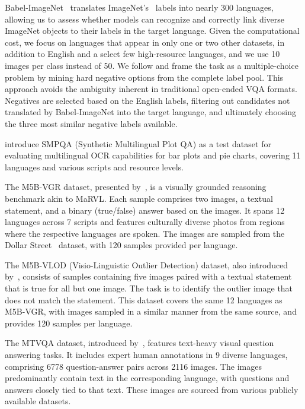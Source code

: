 %
%
Babel-ImageNet~\cite{geigle-etal-2024-babel} translates ImageNet’s~\cite{deng_imagenet_2009} labels into nearly 300 languages, allowing us to assess whether models can recognize and correctly link diverse ImageNet objects to their labels in the target language. Given the computational cost, we focus on languages that appear in only one or two other datasets, in addition to English and a select few high-resource languages, and we use 10 images per class instead of 50. We follow \citet{geigle-etal-2024-african} and frame the task as a multiple-choice problem by mining hard negative options from the complete label pool. This approach avoids the ambiguity inherent in traditional open-ended VQA formats. Negatives are selected based on the English labels, filtering out candidates not translated by Babel-ImageNet into the target language, and ultimately choosing the three most similar negative labels available.

%
%
\citet{geigle2025centurio} introduce SMPQA (Synthetic Multilingual Plot QA) as a test dataset for evaluating multilingual OCR capabilities for bar plots and pie charts, covering 11 languages and various scripts and resource levels.

%
%
The M5B-VGR dataset, presented by~\cite{schneider-sitaram-2024-m5}, is a visually grounded reasoning benchmark akin to MaRVL. Each sample comprises two images, a textual statement, and a binary (true/false) answer based on the images. It spans 12 languages across 7 scripts and features culturally diverse photos from regions where the respective languages are spoken. The images are sampled from the Dollar Street~\cite{gaviria2022dollar} dataset, with 120 samples provided per language.

%
%
The M5B-VLOD (Visio-Linguistic Outlier Detection) dataset, also introduced by~\cite{schneider-sitaram-2024-m5}, consists of samples containing five images paired with a textual statement that is true for all but one image. The task is to identify the outlier image that does not match the statement. This dataset covers the same 12 languages as M5B-VGR, with images sampled in a similar manner from the same source, and provides 120 samples per language.

%
%
The MTVQA dataset, introduced by~\cite{tang2024mtvqa}, features text-heavy visual question answering tasks. It includes expert human annotations in 9 diverse languages, comprising 6778 question-answer pairs across 2116 images. The images predominantly contain text in the corresponding language, with questions and answers closely tied to that text. These images are sourced from various publicly available datasets.

